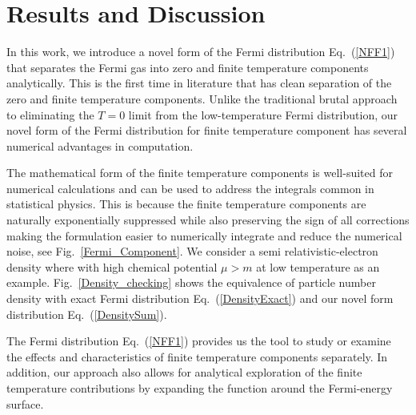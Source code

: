\documentclass[sn-mathphys,Numbered]{sn-jnl}
\begin{document}



\section{Results and Discussion}
\label{sec12}
In this work, we introduce a novel form of the Fermi distribution Eq.~(\ref{NFF1}) that separates the Fermi gas into zero and finite temperature components analytically. This is the first time in literature that has clean separation of the zero and finite temperature components. Unlike the traditional brutal approach to eliminating the $T=0$ limit from the low-temperature Fermi distribution, our novel form of the Fermi distribution for finite temperature component has several numerical advantages in computation. 

 
The mathematical form of the finite temperature components is well-suited for numerical calculations and can be used to address the integrals common in statistical physics. This is because the finite temperature components are naturally exponentially suppressed while also preserving the sign of all corrections making the formulation easier to numerically integrate and reduce the numerical noise, see Fig.~\ref{Fermi_Component}. We consider a semi relativistic-electron density where with high chemical potential $\mu>m$ at low temperature as an example. Fig.~\ref{Density_checking} shows the equivalence of particle number density with exact Fermi distribution Eq.~(\ref{DensityExact}) and our novel form  distribution Eq.~(\ref{DensitySum}). 
 
The Fermi distribution Eq.~(\ref{NFF1}) provides us the tool to study or examine the effects and characteristics of finite temperature components separately. In addition, our approach also allows for analytical exploration of the finite temperature contributions by expanding the function around the Fermi-energy surface.



\end{document}
